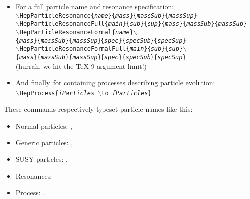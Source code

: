 \documentclass[12pt]{article}
\begin{document}
\begin{itemize}
\item For a full particle name and resonance specification:\\
  \texttt{$\backslash{}$HepParticleResonance\{\textit{name}\}\{\textit{mass}\}\{\textit{massSub}\}\{\textit{massSup}\}}\\
  \texttt{$\backslash{}$HepParticleResonanceFull\{\textit{main}\}\{\textit{sub}\}\{\textit{sup}\}\{\textit{mass}\}\{\textit{massSub}\}\{\textit{massSup}\}}\\
  \texttt{$\backslash{}$HepParticleResonanceFormal\{\textit{name}\}$\backslash{}$\\\{\textit{mass}\}\{\textit{massSub}\}\{\textit{massSup}\}\{\textit{spec}\}\{\textit{specSub}\}\{\textit{specSup}\}}\\
  \texttt{$\backslash{}$HepParticleResonanceFormalFull\{\textit{main}\}\{\textit{sub}\}\{\textit{sup}\}$\backslash{}$\\\{\textit{mass}\}\{\textit{massSub}\}\{\textit{massSup}\}\{\textit{spec}\}\{\textit{specSub}\}\{\textit{specSup}\}}\\
  (hurrah, we hit the \TeX{} 9-argument limit!)

\item And finally, for containing processes describing particle evolution:\\
  \texttt{$\backslash{}$HepProcess\{\textit{iParticles} $\backslash$to \textit{fParticles}\}}.\\
\end{itemize}


\noindent These commands respectively typeset particle names like this:\\[-1ex]
\begin{itemize}
\item Normal particles:  , 
\item Generic particles: , \HepGenAntiParticle{\ell}{\mu}{}
\item SUSY particles:    , 
\item Resonances:        
\item Process:           .
\end{itemize}
\end{document}
